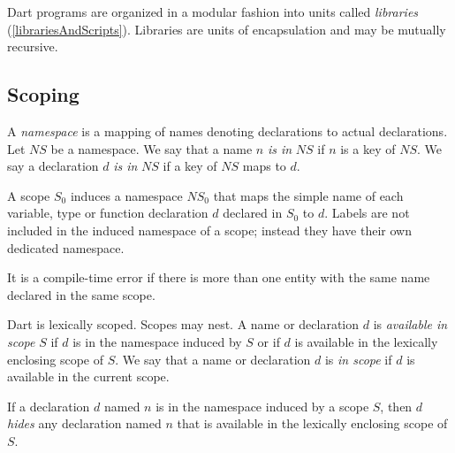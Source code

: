 \documentclass{article}
\begin{document}
\LMHash{}
Dart programs are organized in a modular fashion into units called {\em libraries} (\ref{librariesAndScripts}).
Libraries are units of encapsulation and may be mutually recursive.



\subsection{Scoping}

\LMHash{}
A {\em namespace} is a mapping of names denoting declarations to actual declarations.
Let $NS$ be a namespace.
We say that a name $n$ {\em is in }$NS$ if $n$ is a key of $NS$.
We say a declaration $d$ {\em is in }$NS$ if a key of $NS$ maps to $d$.

\LMHash{}
A scope $S_0$ induces a namespace $NS_0$ that maps the simple name of each variable, type or function declaration $d$ declared in $S_0$ to $d$.
Labels are not included in the induced namespace of a scope; instead they have their own dedicated namespace.


\LMHash{}
It is a compile-time error if there is more than one entity with the same name declared in the same scope.


\LMHash{}
Dart is lexically scoped.
Scopes may nest.
A name or declaration $d$ is {\em available in scope} $S$ if $d$ is in the namespace induced by $S$ or if $d$ is available in the lexically enclosing scope of $S$.
We say that a name or declaration $d$ is {\em in scope} if $d$ is available in the current scope.

\LMHash{}
If a declaration $d$ named $n$ is in the namespace induced by a scope $S$, then $d$ {\em hides} any declaration named $n$ that is available in the lexically enclosing scope of $S$.
\end{document}
